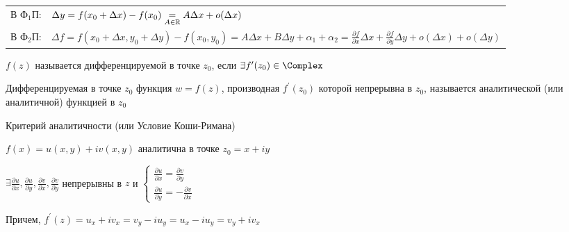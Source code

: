 \documentclass[12pt]{article}
\begin{document}
\begin{tabular}{ll}
    В Ф$_1$П: & $\Delta y = f(x_0 + \Delta x) - f(x_0) \underset{A \in \mathbb{R}}{=} A\Delta x + o(\Delta x)$ \\
    В Ф$_2$П: & $\Delta f = f(x_0 + \Delta x, y_0 + \Delta y) - f(x_0, y_0) = A\Delta x + B \Delta y + \alpha_1 + \alpha_2 = 
    \frac{\partial f}{\partial x} \Delta x + \frac{\partial f}{\partial y} \Delta y + o(\Delta x) + o(\Delta y)$
\end{tabular}

\hypertarget{derivative}{}

\Def $f(z)$ называется дифференцируемой в точке $z_0$, если $\exists f^\prime(z_0) \in \Complex$

\Defs Дифференцируемая в точке $z_0$ функция $w = f(z)$, производная $f^\prime(z_0)$ которой непрерывна в $z_0$,
называется аналитической (или аналитичной) функцией в $z_0$

\hypertarget{cauchy_riemann}{}

\begin{MyTheorem}
    \Ths Критерий аналитичности (или Условие Коши-Римана)

    \begin{center}
        $f(x) = u(x, y) + i v(x, y)$ аналитична в точке $z_0 = x + iy$ 
        
    
        $\exists \frac{\partial u}{\partial x}, \frac{\partial u}{\partial y}, \frac{\partial v}{\partial x}, \frac{\partial v}{\partial y}$ непрерывны в $z$ и
        $\begin{cases}\frac{\partial u}{\partial x} = \frac{\partial v}{\partial y} \\ \frac{\partial u}{\partial y} = -\frac{\partial v}{\partial x}\end{cases}$
    \end{center}

    Причем, $f^\prime(z) = u_x + i v_x = v_y - i u_y = u_x - i u_y = v_y + i v_x$
\end{MyTheorem}
\end{document}
